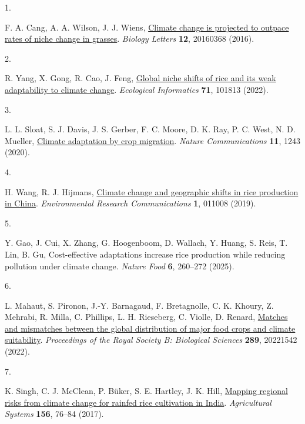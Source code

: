 \documentclass[
  letterpaper,
  DIV=11,
  numbers=noendperiod]{scrartcl}
\newlength{\cslhangindent}
\newlength{\csllabelwidth}
\newenvironment{CSLReferences}[2] %
 {\begin{list}{}{%
  \setlength{\itemindent}{0pt}
  \setlength{\leftmargin}{0pt}
  \setlength{\parsep}{0pt}
  \ifodd #1
   \setlength{\leftmargin}{\cslhangindent}
   \setlength{\itemindent}{-1\cslhangindent}
  \fi
  \setlength{\itemsep}{#2\baselineskip}}}
 {\end{list}}
\newcommand{\CSLLeftMargin}[1]{\parbox[t]{\csllabelwidth}{\strut#1\strut}}
\newcommand{\CSLRightInline}[1]{\parbox[t]{\linewidth - \csllabelwidth}{\strut#1\strut}}
\begin{document}
\label{refs}
\begin{CSLReferences}{0}{1}
\CSLLeftMargin{1. }%
\CSLRightInline{F. A. Cang, A. A. Wilson, J. J. Wiens,
\href{https://doi.org/10/gnjmsx}{Climate change is projected to outpace
rates of niche change in grasses}. \emph{Biology Letters} \textbf{12},
20160368 (2016).}

\CSLLeftMargin{2. }%
\CSLRightInline{R. Yang, X. Gong, R. Cao, J. Feng,
\href{https://doi.org/10.1016/j.ecoinf.2022.101813}{Global niche shifts
of rice and its weak adaptability to climate change}. \emph{Ecological
Informatics} \textbf{71}, 101813 (2022).}

\CSLLeftMargin{3. }%
\CSLRightInline{L. L. Sloat, S. J. Davis, J. S. Gerber, F. C. Moore, D.
K. Ray, P. C. West, N. D. Mueller,
\href{https://doi.org/10.1038/s41467-020-15076-4}{Climate adaptation by
crop migration}. \emph{Nature Communications} \textbf{11}, 1243 (2020).}

\CSLLeftMargin{4. }%
\CSLRightInline{H. Wang, R. J. Hijmans,
\href{https://doi.org/10.1088/2515-7620/ab0856}{Climate change and
geographic shifts in rice production in China}. \emph{Environmental
Research Communications} \textbf{1}, 011008 (2019).}

\CSLLeftMargin{5. }%
\CSLRightInline{Y. Gao, J. Cui, X. Zhang, G. Hoogenboom, D. Wallach, Y.
Huang, S. Reis, T. Lin, B. Gu, Cost-effective adaptations increase rice
production while reducing pollution under climate change. \emph{Nature
Food} \textbf{6}, 260--272 (2025).}

\CSLLeftMargin{6. }%
\CSLRightInline{L. Mahaut, S. Pironon, J.-Y. Barnagaud, F. Bretagnolle,
C. K. Khoury, Z. Mehrabi, R. Milla, C. Phillips, L. H. Rieseberg, C.
Violle, D. Renard, \href{https://doi.org/10.1098/rspb.2022.1542}{Matches
and mismatches between the global distribution of major food crops and
climate suitability}. \emph{Proceedings of the Royal Society B:
Biological Sciences} \textbf{289}, 20221542 (2022).}

\CSLLeftMargin{7. }%
\CSLRightInline{K. Singh, C. J. McClean, P. Büker, S. E. Hartley, J. K.
Hill, \href{https://doi.org/10.1016/j.agsy.2017.05.009}{Mapping regional
risks from climate change for rainfed rice cultivation in India}.
\emph{Agricultural Systems} \textbf{156}, 76--84 (2017).}


\end{CSLReferences}
\end{document}
